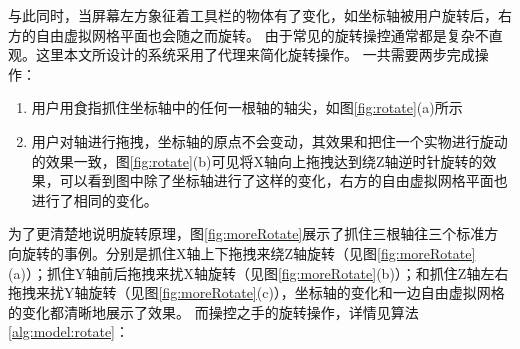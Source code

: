 与此同时，当屏幕左方象征着工具栏的物体有了变化，如坐标轴被用户旋转后，右方的自由虚拟网格平面也会随之而旋转。
由于常见的旋转操控通常都是复杂不直观。这里本文所设计的系统采用了代理来简化旋转操作。
一共需要两步完成操作：
\begin{enumerate}[1]
\item	%
用户用食指抓住坐标轴中的任何一根轴的轴尖，如图\ref{fig:rotate}(a)所示
\item	%
用户对轴进行拖拽，坐标轴的原点不会变动，其效果和把住一个实物进行旋动的效果一致，图\ref{fig:rotate}(b)可见将X轴向上拖拽达到绕Z轴逆时针旋转的效果，可以看到图中除了坐标轴进行了这样的变化，右方的自由虚拟网格平面也进行了相同的变化。
\end{enumerate}

\begin{figure}[b]
  \centering
  \subfigure{\label{fig:rotate:1}}\addtocounter{subfigure}{-2}
	\subfigure{\label{fig:rotate:2}}\addtocounter{subfigure}{-2}
\end{figure}

\begin{figure}[!htp]
  \centering
   \subfigure{\label{fig:moreRotate:1}}\addtocounter{subfigure}{-2}
	\subfigure{\label{fig:moreRotate:2}}\addtocounter{subfigure}{-2}
		\subfigure{\label{fig:moreRotate:3}}\addtocounter{subfigure}{-2}
\end{figure}

为了更清楚地说明旋转原理，图\ref{fig:moreRotate}展示了抓住三根轴往三个标准方向旋转的事例。分别是抓住X轴上下拖拽来绕Z轴旋转（见图\ref{fig:moreRotate}(a)）；抓住Y轴前后拖拽来扰X轴旋转（见图\ref{fig:moreRotate}(b)）；和抓住Z轴左右拖拽来扰Y轴旋转（见图\ref{fig:moreRotate}(c)），坐标轴的变化和一边自由虚拟网格的变化都清晰地展示了效果。
而操控之手的旋转操作，详情见算法\ref{alg:model:rotate}：

